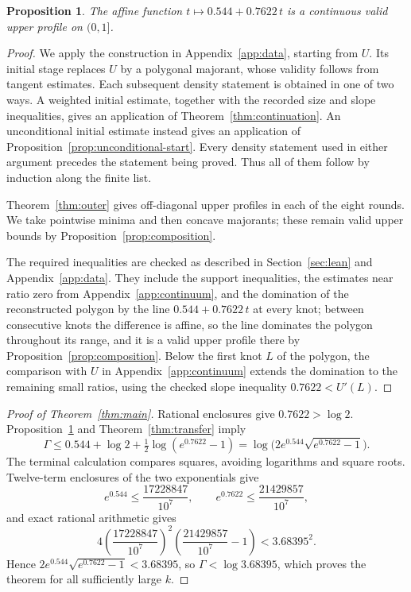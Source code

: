 \documentclass[11pt]{article}
\newtheorem{proposition}[theorem]{Proposition}
\theoremstyle{definition}
\theoremstyle{remark}
\newcommand{\Gam}{\Gamma}
\numberwithin{equation}{section}
\begin{document}
\begin{proposition}\label{prop:source}
The affine function $t\mapsto0.544+0.7622\,t$ is a continuous valid
upper profile on $(0,1]$.
\end{proposition}
\begin{proof}
We apply the construction in Appendix~\ref{app:data}, starting
from $U$. Its initial stage replaces $U$ by a polygonal majorant,
whose validity follows from tangent estimates. Each subsequent density
statement is obtained in one of two ways. A weighted initial estimate,
together with the recorded size and slope inequalities, gives an
application of Theorem~\ref{thm:continuation}. An unconditional
initial estimate instead gives an application of
Proposition~\ref{prop:unconditional-start}. Every density statement
used in either argument precedes the statement being proved. Thus all
of them follow by induction along the finite list.

Theorem~\ref{thm:outer} gives off-diagonal upper profiles in each of
the eight rounds. We take pointwise minima and then concave majorants;
these remain valid upper bounds by
Proposition~\ref{prop:composition}.

The required inequalities are checked as described in
Section~\ref{sec:lean} and Appendix~\ref{app:data}. They
include the support inequalities, the estimates near ratio zero from
Appendix~\ref{app:continuum}, and the domination of the reconstructed
polygon by the line $0.544+0.7622\,t$ at every knot; between
consecutive knots the difference is affine, so the line dominates the
polygon throughout its range, and it is a valid upper profile there by
Proposition~\ref{prop:composition}. Below the first knot $L$ of the
polygon, the comparison with $U$ in Appendix~\ref{app:continuum}
extends the domination to the remaining small ratios, using the
checked slope inequality $0.7622<U'(L)$.
\end{proof}

\begin{proof}[Proof of Theorem~\ref{thm:main}]
Rational enclosures give $0.7622>\log2$. Proposition~\ref{prop:source}
and Theorem~\ref{thm:transfer} imply
\[
 \Gam\le 0.544+\log2+\tfrac12\log(e^{0.7622}-1)
 =\log\bigl(2e^{0.544}\sqrt{e^{0.7622}-1}\bigr).
\]
The terminal calculation compares squares, avoiding logarithms and
square roots. Twelve-term enclosures of the two exponentials give
\begin{equation}\label{eq:terminal-enclosure}
 e^{0.544}\le\frac{17228847}{10^7},\qquad
 e^{0.7622}\le\frac{21429857}{10^7},
\end{equation}
and exact rational arithmetic gives
\[
 4\left(\frac{17228847}{10^7}\right)^{\!2}
 \left(\frac{21429857}{10^7}-1\right)<3.68395^2.
\]
Hence $2e^{0.544}\sqrt{e^{0.7622}-1}<3.68395$, so
$\Gam<\log3.68395$, which proves the theorem for all sufficiently
large $k$.
\end{proof}
\end{document}
